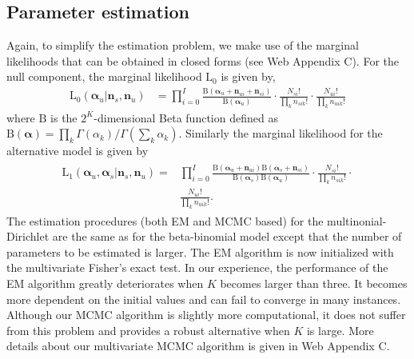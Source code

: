 \documentclass[useAMS,referee,usenatbib]{biom}
\begin{document}
\subsection{Parameter estimation}
Again, to simplify the estimation problem, we make use of the marginal likelihoods that can be obtained in closed forms (see Web Appendix C). For the null component, the marginal likelihood $\mathrm{L}_0$ is given by,
\begin{align*}
\mathrm{L}_0(\boldsymbol{\alpha}_u|\mathbf{n}_s,\mathbf{n}_u) &= \prod_{i=0}^I\frac{ \mathrm{B}(\boldsymbol{\alpha}_{u}+\mathbf{n}_{ui}+\mathbf{n}_{si})}{\mathrm{B}(\boldsymbol{\alpha}_u)} \cdot \frac{N_{si}!}{\prod_k n_{sik}!} \cdot \frac{N_{ui}!}{\prod_k n_{uik}!}
\end{align*}
where $\mathrm{B}$ is the $2^K$-dimensional Beta function defined as $\mathrm{B}(\boldsymbol{\alpha})=\prod_k\Gamma(\alpha_k)/\Gamma(\sum_k\alpha_k)$. Similarly the marginal likelihood for the alternative model is given by 
\begin{align*}
\begin{split}
\mathrm{L}_1(\boldsymbol{\alpha}_u,\boldsymbol{\alpha}_s|\mathbf{n}_s,\mathbf{n}_u) =& \prod_{i=0}^I\frac{\mathrm{B}(\boldsymbol{\alpha}_{u}+\mathbf{n}_{ui}) \mathrm{B}(\boldsymbol{\alpha}_{s}+\mathbf{n}_{si})}{\mathrm{B}(\boldsymbol{\alpha}_s)\mathrm{B}(\boldsymbol{\alpha}_u)} \cdot \frac{N_{si}!}{\prod_k n_{sik}!} \cdot \\ &\frac{N_{ui}!}{\prod_k n_{uik}!}.%
\end{split}
\end{align*}
The estimation procedures (both EM and MCMC based) for the multinonial-Dirichlet are the same as for the beta-binomial model except that the number of parameters to be estimated is larger. The EM algorithm is now initialized with the multivariate Fisher's exact test. In our experience, the performance of the EM algorithm greatly deteriorates when $K$ becomes larger than three. It becomes more dependent on the initial values and can fail to converge in many instances. Although our MCMC algorithm is slightly more computational, it does not suffer from this problem and provides a robust alternative when $K$ is large. More details about our multivariate MCMC algorithm is given in Web Appendix C. 
\end{document}
